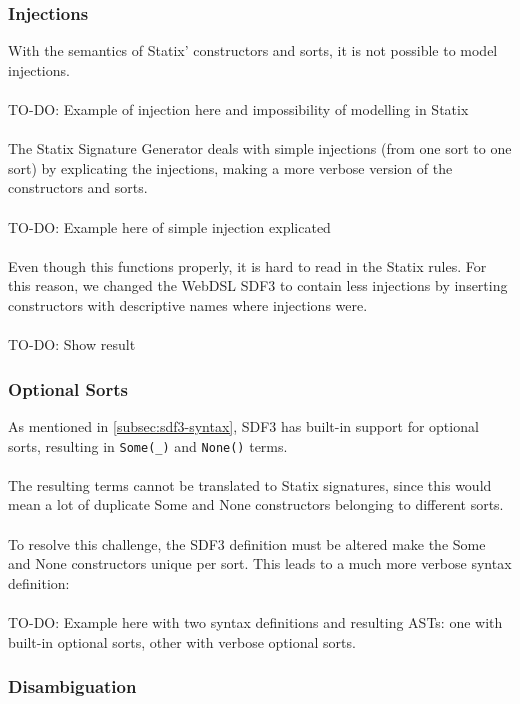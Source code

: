       \subsubsection{Injections}

        With the semantics of Statix' constructors and sorts, it is not possible to model injections.
        \\\\TO-DO: Example of injection here and impossibility of modelling in Statix
        \\\\The Statix Signature Generator deals with simple injections (from one sort to one sort) by explicating the injections, making a more verbose version of the constructors and sorts.
        \\\\TO-DO: Example here of simple injection explicated
        \\\\Even though this functions properly, it is hard to read in the Statix rules. For this reason, we changed the WebDSL SDF3 to contain less injections by inserting constructors with descriptive names where injections were.
        \\\\TO-DO: Show result

      \subsubsection{\label{subsubsec:sdf3-optional-sorts}Optional Sorts}

        As mentioned in \cref{subsec:sdf3-syntax}, SDF3 has built-in support for optional sorts, resulting in \texttt{Some(\_)} and \texttt{None()} terms.
        \\\\The resulting terms cannot be translated to Statix signatures, since this would mean a lot of duplicate Some and None constructors belonging to different sorts.
        \\\\To resolve this challenge, the SDF3 definition must be altered make the Some and None constructors unique per sort. This leads to a much more verbose syntax definition:
        \\\\TO-DO: Example here with two syntax definitions and resulting ASTs: one with built-in optional sorts, other with verbose optional sorts.

      \subsubsection{Disambiguation}

